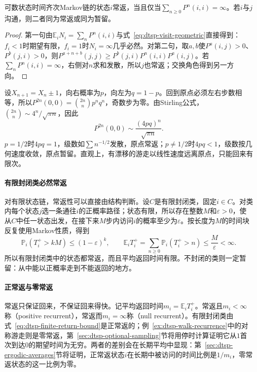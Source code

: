 \begin{theorem}[常返的级数判别]
  \label{thm:dtsp-recurrence-series}
  可数状态时间齐次Markov链的状态$i$常返，当且仅当$\sum_{n\geq0}P^n(i,i)=\infty$。若$i$与$j$沟通，则二者同为常返或同为暂留。
\end{theorem}

\begin{proof}
第一句由$\mathbb E_iN_i=\sum_nP^n(i,i)$与式~\eqref{eq:dtsp-visit-geometric}直接得到：$f_i<1$时期望有限，$f_i=1$时$N_i=\infty$几乎必然。对第二句，取$a,b$使$P^a(i,j)>0$、$P^b(j,i)>0$，则$P^{a+n+b}(j,j)\geq P^b(j,i)P^n(i,i)P^a(i,j)$。若$\sum_nP^n(i,i)=\infty$，右侧对$n$求和发散，所以$j$也常返；交换角色得到另一方向。
\end{proof}

\begin{example}[整数格点上的随机游走]
  \label{ex:dtsp-walk-recurrence}
  设$X_{n+1}=X_n\pm1$，向右概率为$p$，向左为$q=1-p$。回到原点必须左右步数相等，所以$P^{2n}(0,0)=\binom{2n}{n}p^nq^n$，奇数步为零。由Stirling公式，$\binom{2n}{n}\sim4^n/\sqrt{\pi n}$，因此
  \[
    P^{2n}(0,0)\sim\frac{(4pq)^n}{\sqrt{\pi n}}.
  \]
  $p=1/2$时$4pq=1$，级数如$\sum n^{-1/2}$发散，原点常返；$p\neq1/2$时$4pq<1$，级数按几何速度收敛，原点暂留。直观上，有漂移的游走以线性速度远离原点，只能回来有限次。
\end{example}

\paragraph{有限封闭类必然常返}
对有限状态链，常返性可以直接由结构判断。设$C$是有限封闭类，固定$i\in C$。对类内每个状态$j$选一条通往$i$的正概率路径；状态有限，所以存在整数$M$和$\varepsilon>0$，使从$C$中任一状态出发，在接下来$M$步内访问$i$的概率至少为$\varepsilon$。按长度为$M$的时间块反复使用Markov性质，得到
\begin{equation}
  \mathbb P_i(T_i^{+}>kM)\leq(1-\varepsilon)^k,\qquad
  \mathbb E_iT_i^{+}=\sum_{n\geq0}\mathbb P_i(T_i^{+}>n)\leq\frac{M}{\varepsilon}<\infty.
  \label{eq:dtsp-finite-return-bound}
\end{equation}
所以有限封闭类中的状态都常返，而且平均返回时间有限。不封闭的类则一定暂留：从中能以正概率走到不能返回的地方。

\paragraph{正常返与零常返}
常返只保证回来，不保证回来得快。记平均返回时间$m_i=\mathbb E_iT_i^{+}$。常返且$m_i<\infty$称（positive recurrent），常返而$m_i=\infty$称（null recurrent）。有限封闭类由式~\eqref{eq:dtsp-finite-return-bound}是正常返的；例~\ref{ex:dtsp-walk-recurrence}中的对称游走则是零常返，第~\ref{sec:dtsp-optional-sampling}节将用停时计算证明它从$1$首次到达$0$的期望时间为无穷。两者的差别会在长期平均中显现：第~\ref{sec:dtsp-ergodic-averages}节将证明，正常返状态$i$在长期中被访问的时间比例是$1/m_i$，零常返状态的这一比例为零。

